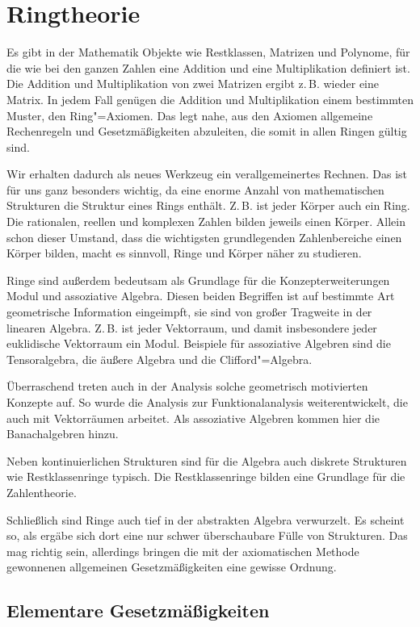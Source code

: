 \section{Ringtheorie}

Es gibt in der Mathematik Objekte wie Restklassen, Matrizen
und Polynome, für die wie bei den ganzen Zahlen eine Addition und
eine Multiplikation definiert ist. Die Addition und Multiplikation
von zwei Matrizen ergibt z.\,B. wieder eine Matrix. In jedem Fall
genügen die Addition und Multiplikation einem bestimmten Muster, den
Ring"=Axiomen. Das legt nahe, aus den Axiomen allgemeine Rechenregeln
und Gesetzmäßigkeiten abzuleiten, die somit in allen Ringen gültig
sind.

Wir erhalten dadurch als neues Werkzeug ein verallgemeinertes Rechnen.
Das ist für uns ganz besonders wichtig, da eine enorme Anzahl
von mathematischen Strukturen die Struktur eines Rings enthält.
Z.\,B. ist jeder Körper auch ein Ring. Die rationalen, reellen
und komplexen Zahlen bilden jeweils einen Körper. Allein schon
dieser Umstand, dass die wichtigsten grundlegenden Zahlenbereiche
einen Körper bilden, macht es sinnvoll, Ringe und Körper näher zu
studieren.

Ringe sind außerdem bedeutsam als Grundlage für die
Konzepterweiterungen Modul und assoziative Algebra. 
Diesen beiden Begriffen ist auf bestimmte Art geometrische
Information eingeimpft, sie sind von großer Tragweite in der
linearen Algebra. Z.\,B. ist jeder Vektorraum, und damit insbesondere
jeder euklidische Vektorraum ein Modul. Beispiele für assoziative
Algebren sind die Tensoralgebra, die äußere Algebra und die
Clifford"=Algebra.

Überraschend treten auch in der Analysis solche geometrisch
motivierten Konzepte auf. So wurde die Analysis zur Funktionalanalysis
weiterentwickelt, die auch mit Vektorräumen arbeitet. Als assoziative
Algebren kommen hier die Banachalgebren hinzu.

Neben kontinuierlichen Strukturen sind für die Algebra auch
diskrete Strukturen wie Restklassenringe typisch. Die Restklassenringe
bilden eine Grundlage für die Zahlentheorie.

Schließlich sind Ringe auch tief in der abstrakten Algebra verwurzelt.
Es scheint so, als ergäbe sich dort eine nur schwer überschaubare Fülle
von Strukturen. Das mag richtig sein, allerdings bringen die mit der
axiomatischen Methode gewonnenen allgemeinen Gesetzmäßigkeiten eine
gewisse Ordnung.

\subsection{Elementare Gesetzmäßigkeiten}

